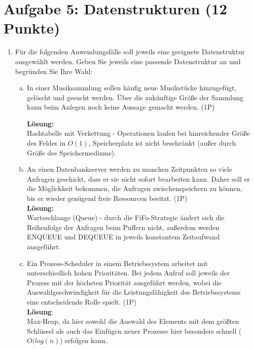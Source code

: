 \documentclass{scrartcl}
\begin{document}
\section*{Aufgabe 5: Datenstrukturen (12 Punkte)}
\begin{enumerate}[(1)]
\item Für die folgenden Anwendungsfälle soll jeweils eine geeignete Datenstruktur ausgewählt werden. Geben Sie jeweils eine passende Datenstruktur an und begründen Sie Ihre Wahl:
\begin{enumerate}[(a)]
\item In einer Musiksammlung sollen häufig neue Musikstücke hinzugefügt, gelöscht und gesucht werden. Über die zukünftige Größe der Sammlung kann beim Anlegen noch keine Aussage gemacht werden. (1P)
\pagebreak

\textbf{Lösung:}\\
Hashtabelle mit Verkettung - Operationen laufen bei hinreichender Größe des Feldes in $O(1)$, Speicherplatz ist nicht beschränkt (außer durch Größe des Speichermediums).
\item An einen Datenbankserver werden zu manchen Zeitpunkten so viele Anfragen geschickt, dass er sie nicht sofort bearbeiten kann. Daher soll er die Möglichkeit bekommen, die Anfragen zwischenspeichern zu können, bis er wieder genügend freie Ressourcen besitzt. (1P)\\
\textbf{Lösung:}\\
Warteschlange (Queue) - durch die FiFo-Strategie ändert sich die Reihenfolge der Anfragen beim Puffern nicht, außerdem werden ENQUEUE und DEQUEUE in jeweils konstantem Zeitaufwand ausgeführt.
\item Ein Prozess-Scheduler in einem Betriebssystem arbeitet mit unterschiedlich hohen Prioritäten. Bei jedem Aufruf soll jeweils der Prozess mit der höchsten Priorität ausgeführt werden, wobei die Auswahlgeschwindigkeit für die Leistungsfähigkeit des Betriebssystems eine entscheidende Rolle spielt. (1P)\\
\textbf{Lösung}:\\
Max-Heap, da hier sowohl die Auswahl des Elements mit dem größten Schlüssel als auch das Einfügen neuer Prozesse hier besonders schnell ($O(log(n)$) erfolgen kann. 
\end{enumerate}


\end{enumerate}
\end{document}
